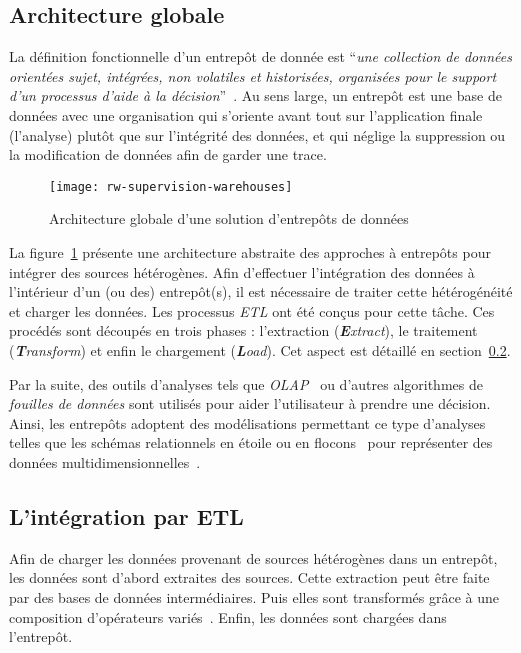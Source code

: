 \subsection{Architecture globale}
La définition fonctionnelle d'un entrepôt de donnée est \enquote{\it une collection de données orientées sujet, intégrées, non volatiles et historisées, organisées pour le support d'un processus d'aide à la décision}~\cite{Inmon:warehouse}. Au sens large, un entrepôt est une base de données avec une organisation qui s'oriente avant tout sur l'application finale (l'analyse) plutôt que sur l'intégrité des données, et qui néglige la suppression ou la modification de données afin de garder une trace.
\begin{figure}[ht]
	\centering
	\texttt{[image: rw-supervision-warehouses]}
	\caption{Architecture globale d'une solution d'entrepôts de données}\label{fig:rw:supervision:warehouses}
\end{figure}
La figure~\ref{fig:rw:supervision:warehouses} présente une architecture abstraite des approches à entrepôts pour intégrer des sources hétérogènes. Afin d'effectuer l'intégration des données à l'intérieur d'un (ou des) entrepôt(s), il est nécessaire de traiter cette hétérogénéité et charger les données. Les processus \textit{ETL} ont été conçus pour cette tâche. Ces procédés sont découpés en trois phases : l'extraction (\textit{\textbf{E}xtract}), le traitement (\textit{\textbf{T}ransform}) et enfin le chargement (\textit{\textbf{L}oad}). Cet aspect est détaillé en section~\ref{sec:rw:supervision:warehouse:etl}.

Par la suite, des outils d'analyses tels que \textit{OLAP}~\cite{Codd:olap} ou d'autres algorithmes de \textit{fouilles de données} sont utilisés pour aider l'utilisateur à prendre une décision. Ainsi, les entrepôts adoptent des modélisations permettant ce type d'analyses telles que les schémas relationnels en étoile ou en flocons~\cite{Levene:snowflake} pour représenter des données multidimensionnelles~\cite{Gray:cube}.

\subsection{L'intégration par ETL}\label{sec:rw:supervision:warehouse:etl}
Afin de charger les données provenant de sources hétérogènes dans un entrepôt, les données sont d'abord extraites des sources. Cette extraction peut être faite par des bases de données intermédiaires. Puis elles sont transformés grâce à une composition d'opérateurs variés~\cite{Vassiliadis:taxonomy}. Enfin, les données sont chargées dans l'entrepôt.

